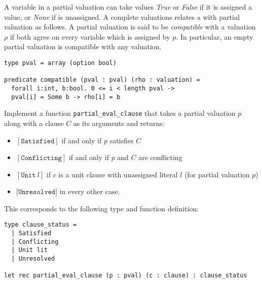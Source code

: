 \documentclass[11pt]{article}
\begin{document}
A variable in a partial valuation can take values \emph{True} or \emph{False} if it is assigned a value, or \emph{None} if is unassigned. A complete valuations relates  a with partial valuation as follows. A partial valuation is said to be \emph{compatible} with a valuation $\rho$ if both agree on every variable which is assigned by $p$. In particular, an empty partial valuation is compatible with any valuation.

\begin{lstlisting}
type pval = array (option bool)

predicate compatible (pval : pval) (rho : valuation) =
  forall i:int, b:bool. 0 <= i < length pval ->
  pval[i] = Some b -> rho[i] = b
\end{lstlisting}

\begin{task}[15 pts] 
Implement a function \verb|partial_eval_clause| that takes a partial valuation $p$ along with a clause $C$ as its arguments and returns:
\begin{itemize}
\setlength\itemsep{0em}
\item $[\texttt{Satisfied}]$ if and only if $p$ satisfies $C$
\item $[\texttt{Conflicting}]$ if and only if $p$ and $C$ are conflicting
\item $[\texttt{Unit}\ l]$ if $c$ is a unit clause with unassigned literal $l$ (for partial valuation $p$)
\item $[\texttt{Unresolved}$] in every other case. 
\end{itemize}
This corresponds to the following type and function definition:
\begin{lstlisting}
type clause_status =
  | Satisfied
  | Conflicting
  | Unit lit
  | Unresolved

let rec partial_eval_clause (p : pval) (c : clause) : clause_status
\end{lstlisting}
\end{task}
\end{document}
